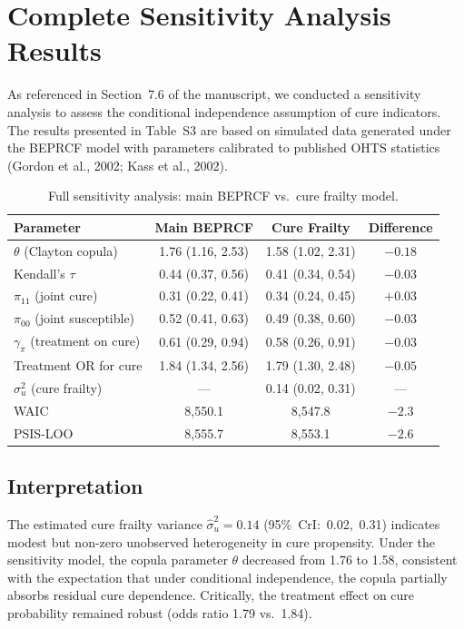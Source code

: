 \documentclass[12pt,a4paper]{article}
\begin{document}
\section{Complete Sensitivity Analysis Results}

As referenced in Section~7.6 of the manuscript, we conducted a sensitivity analysis to assess the conditional independence assumption of cure indicators. The results presented in Table~S3 are based on simulated data generated under the BEPRCF model with parameters calibrated to published OHTS statistics (Gordon et al., 2002; Kass et al., 2002).

\begin{table}[H]
\centering
\caption{Full sensitivity analysis: main BEPRCF vs.\ cure frailty model.}
\label{tab:S3}
\begin{tabular}{lccc}
\toprule
\textbf{Parameter} & \textbf{Main BEPRCF} & \textbf{Cure Frailty} & \textbf{Difference} \\
\midrule
$\theta$ (Clayton copula) & 1.76 (1.16, 2.53) & 1.58 (1.02, 2.31) & $-0.18$ \\
Kendall's $\tau$ & 0.44 (0.37, 0.56) & 0.41 (0.34, 0.54) & $-0.03$ \\
$\pi_{11}$ (joint cure) & 0.31 (0.22, 0.41) & 0.34 (0.24, 0.45) & $+0.03$ \\
$\pi_{00}$ (joint susceptible) & 0.52 (0.41, 0.63) & 0.49 (0.38, 0.60) & $-0.03$ \\
$\gamma_\pi$ (treatment on cure) & 0.61 (0.29, 0.94) & 0.58 (0.26, 0.91) & $-0.03$ \\
Treatment OR for cure & 1.84 (1.34, 2.56) & 1.79 (1.30, 2.48) & $-0.05$ \\
$\sigma^2_u$ (cure frailty) & --- & 0.14 (0.02, 0.31) & --- \\
WAIC & 8{,}550.1 & 8{,}547.8 & $-2.3$ \\
PSIS-LOO & 8{,}555.7 & 8{,}553.1 & $-2.6$ \\
\bottomrule
\end{tabular}
\end{table}

\subsection{Interpretation}

The estimated cure frailty variance $\hat{\sigma}^2_u = 0.14$ (95\%~CrI:~0.02,~0.31) indicates modest but non-zero unobserved heterogeneity in cure propensity. Under the sensitivity model, the copula parameter $\theta$ decreased from 1.76 to 1.58, consistent with the expectation that under conditional independence, the copula partially absorbs residual cure dependence. Critically, the treatment effect on cure probability remained robust (odds ratio 1.79 vs.\ 1.84).
\end{document}
